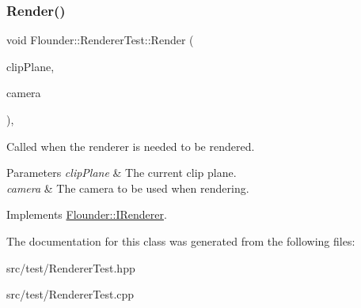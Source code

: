 \subsubsection{\texorpdfstring{Render()}{Render()}}
{\footnotesize\ttfamily void Flounder\+::\+Renderer\+Test\+::\+Render (\begin{DoxyParamCaption}\item[{const \hyperlink{class_flounder_1_1_vector4}{Vector4} \&}]{clip\+Plane,  }\item[{const \hyperlink{class_flounder_1_1_i_camera}{I\+Camera} \&}]{camera }\end{DoxyParamCaption})\hspace{0.3cm}{\ttfamily [override]}, {\ttfamily [virtual]}}



Called when the renderer is needed to be rendered. 


\begin{DoxyParams}{Parameters}
{\em clip\+Plane} & The current clip plane. \\
\hline
{\em camera} & The camera to be used when rendering. \\
\hline
\end{DoxyParams}


Implements \hyperlink{class_flounder_1_1_i_renderer_a4e86d6621f6f63442e1c07655afd9daa}{Flounder\+::\+I\+Renderer}.



The documentation for this class was generated from the following files\+:\begin{DoxyCompactItemize}
\item 
src/test/Renderer\+Test.\+hpp\item 
src/test/Renderer\+Test.\+cpp\end{DoxyCompactItemize}
